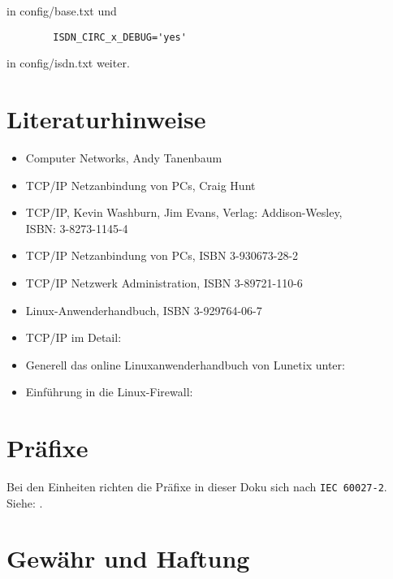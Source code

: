     in config/base.txt und

\begin{example}
\begin{verbatim}
        ISDN_CIRC_x_DEBUG='yes'
\end{verbatim}
\end{example}

    in config/isdn.txt weiter.


    \section{Literaturhinweise}

    \begin{itemize}
    \item Computer Networks, Andy Tanenbaum
    \item TCP/IP Netzanbindung von PCs, Craig Hunt
    \item TCP/IP, Kevin Washburn, Jim Evans, Verlag: Addison-Wesley, \\ISBN: 3-8273-1145-4
    \item TCP/IP Netzanbindung von PCs, ISBN 3-930673-28-2
    \item TCP/IP Netzwerk Administration, ISBN 3-89721-110-6
    \item Linux-Anwenderhandbuch, ISBN 3-929764-06-7
    \item TCP/IP im Detail:\\
    \item Generell das online Linuxanwenderhandbuch von Lunetix unter:\\
    \item Einführung in die Linux-Firewall:
    \end{itemize}

    \section{Präfixe}

    Bei den Einheiten richten die Präfixe in dieser Doku sich nach \verb+IEC 60027-2+.\\
    Siehe: .

    \section{Gewähr und Haftung}

